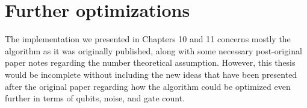 \chapter{Further optimizations}

The implementation we presented in Chapters 10 and 11 concerns mostly the algorithm as it was originally published, along with some necessary post-original paper notes regarding the number theoretical assumption. However, this thesis would be incomplete without including the new ideas that have been presented after the original paper regarding how the algorithm could be optimized even further in terms of qubits, noise, and gate count.
